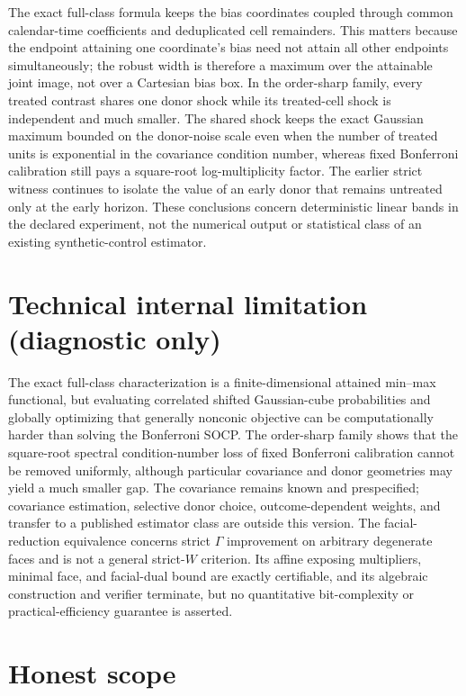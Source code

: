 \documentclass{article}
\begin{document}
The exact full-class formula keeps the bias coordinates coupled through common calendar-time coefficients and deduplicated cell remainders. This matters because the endpoint attaining one coordinate's bias need not attain all other endpoints simultaneously; the robust width is therefore a maximum over the attainable joint image, not over a Cartesian bias box. In the order-sharp family, every treated contrast shares one donor shock while its treated-cell shock is independent and much smaller. The shared shock keeps the exact Gaussian maximum bounded on the donor-noise scale even when the number of treated units is exponential in the covariance condition number, whereas fixed Bonferroni calibration still pays a square-root log-multiplicity factor. The earlier strict witness continues to isolate the value of an early donor that remains untreated only at the early horizon. These conclusions concern deterministic linear bands in the declared experiment, not the numerical output or statistical class of an existing synthetic-control estimator.

\section*{Technical internal limitation (diagnostic only)}

The exact full-class characterization is a finite-dimensional attained min--max functional, but evaluating correlated shifted Gaussian-cube probabilities and globally optimizing that generally nonconic objective can be computationally harder than solving the Bonferroni SOCP. The order-sharp family shows that the square-root spectral condition-number loss of fixed Bonferroni calibration cannot be removed uniformly, although particular covariance and donor geometries may yield a much smaller gap. The covariance remains known and prespecified; covariance estimation, selective donor choice, outcome-dependent weights, and transfer to a published estimator class are outside this version. The facial-reduction equivalence concerns strict \(\Gamma\) improvement on arbitrary degenerate faces and is not a general strict-\(W\) criterion. Its affine exposing multipliers, minimal face, and facial-dual bound are exactly certifiable, and its algebraic construction and verifier terminate, but no quantitative bit-complexity or practical-efficiency guarantee is asserted.

\section{Honest scope}
\end{document}
